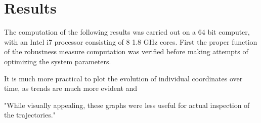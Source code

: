 
    

\chapter{Results} \label {results}
    
    The computation of the following results was carried out on a 64 bit computer, with an Intel i7 processor consisting of 8 1.8 GHz cores. 
    First the proper function of the robustness measure computation was verified before making attempts of optimizing the system parameters.   



    \iffalse
    It is much more practical to plot the evolution of individual coordinates over time, as trends are much more evident and 

    "While visually appealing, these graphs were less useful for actual inspection of the trajectories."

